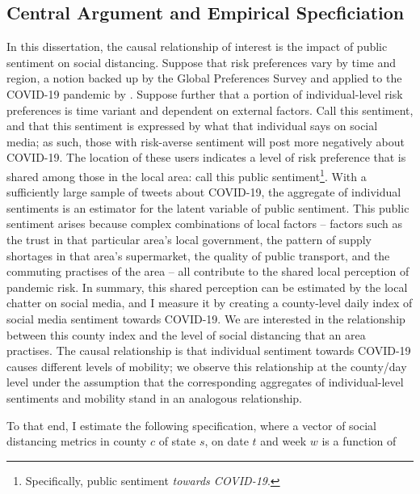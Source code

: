\documentclass{article}
\begin{document}
\subsection{Central Argument and Empirical Specficiation}
In this dissertation, the causal relationship of interest is the impact of public sentiment on social distancing. Suppose that risk preferences vary by time and region, a notion backed up by the Global Preferences Survey \parencite{falkGlobalEvidenceEconomic2018} and applied to the COVID-19 pandemic by \textcite{fanHeterogeneousActionsBeliefs2020}. Suppose further that a portion of individual-level risk preferences is time variant and dependent on external factors.  Call this sentiment, and that this sentiment is expressed by what that individual says on social media; as such, those with risk-averse sentiment will post more negatively about COVID-19. The location of these users indicates a level of risk preference that is shared among those in the local area: call this public sentiment\footnote{Specifically, public sentiment \textit{towards COVID-19}.}. With a sufficiently large sample of tweets about COVID-19, the aggregate of individual sentiments is an estimator for the latent variable of public sentiment. This public sentiment arises because complex combinations of local factors -- factors such as the trust in that particular area's local government, the pattern of supply shortages in that area's supermarket, the quality of public transport, and the commuting practises of the area -- all contribute to the shared local perception of pandemic risk. In summary, this shared perception can be estimated by the local chatter on social media, and I measure it by creating a county-level daily index of social media sentiment towards COVID-19. We are interested in the relationship between this county index and the level of social distancing that an area practises. The causal relationship is that individual sentiment towards COVID-19 causes different levels of mobility; we observe this relationship at the county/day level under the assumption that the corresponding aggregates of individual-level sentiments and mobility stand in an analogous relationship.

To that end, I estimate the following specification, where a vector of social distancing metrics in county \(c\) of state \(s\), on date \(t\) and week \(w\) is a function of
\end{document}

